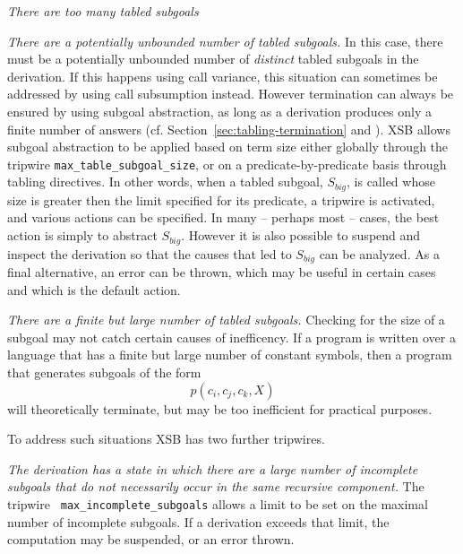 \bi
\item {\em There are too many tabled subgoals} 
\bi
\item {\em There are a potentially unbounded number of tabled
 subgoals.}\/ In this case, there must be a potentially unbounded
 number of {\em distinct} tabled subgoals in the derivation.  If this
 happens using call variance, this situation can sometimes be
 addressed by using call subsumption instead.  However termination can
 always be ensured by using subgoal abstraction, as long as a
 derivation produces only a finite number of answers
 (cf. Section~\ref{sec:tabling-termination} and \cite{RigS14}).  XSB
 allows subgoal abstraction to be applied based on term size either
 globally through the tripwire {\tt max\_table\_subgoal\_size}, or on
 a predicate-by-predicate basis through tabling directives.  In other
 words, when a tabled subgoal, $S_{big}$, is called whose size is
 greater then the limit specified for its predicate, a tripwire is
 activated, and various actions can be specified.  In many -- perhaps
 most -- cases, the best action is simply to abstract $S_{big}$.
  However it is also possible to suspend and inspect the derivation so
 that the causes that led to $S_{big}$ can be analyzed.  As a final
 alternative, an error can be thrown, which may be useful in certain
 cases and which is the default action.

\item {\em There are a finite but large number of tabled
  subgoals.}\/ Checking for the size of a subgoal may not catch certain
  causes of inefficency. If a program is written over a language that
  has a finite but large number of constant symbols, then a program
  that generates subgoals of the form
\[
   p(c_i,c_j,c_k,X)
\]
  will theoretically terminate, but may be too inefficient for
  practical purposes.  

  To address such situations XSB has two further tripwires.
\bi
\item {\em The derivation has a state in which there are a large
 number of incomplete subgoals that do not necessarily occur in the
 same recursive component.}\/ The tripwire {\tt
 max\_incomplete\_subgoals} allows a limit to be set on the maximal
 number of incomplete subgoals.  If a derivation exceeds that limit,
 the computation may be suspended, or an error thrown.

